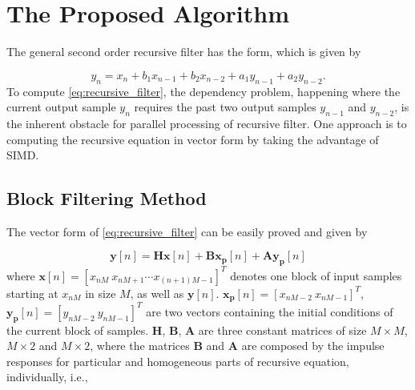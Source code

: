 \section{The Proposed Algorithm}
\label{sec:algorithm}

The general second order recursive filter has the form, which is given by

\begin{equation}
    \label{eq:recursive_filter}
    y_n = x_n + b_1x_{n-1} + b_2x_{n-2} + a_1y_{n-1} + a_2y_{n-2}.
\end{equation}
To compute \eqref{eq:recursive_filter}, the dependency problem, happening where the current output sample $y_n$
requires the past two output samples $y_{n-1}$ and $y_{n-2}$, is the inherent obstacle for parallel processing of recursive filter.
One approach is to computing the recursive equation in vector form by taking the advantage of SIMD. 


\subsection{Block Filtering Method}

The vector form of \eqref{eq:recursive_filter} can be easily proved and given by

\begin{equation}
    \label{eq:block_filtering}
    \bm{y}[n] = \bm{H}\bm{x}[n] + \bm{B}\bm{x_p}[n] + \bm{A}\bm{y_p}[n] 
\end{equation}
where $\bm{x}[n] = \left[x_{nM}~x_{nM+1} \cdots x_{(n+1)M-1}\right]^T$ denotes one block of input samples starting at $x_{nM}$ in size $M$,
as well as $\bm{y}[n]$. $\bm{x_p}[n]=\left[x_{nM-2}~x_{nM-1}\right]^T$, $\bm{y_p}[n]=\left[y_{nM-2}~y_{nM-1}\right]^T$ are two vectors 
containing the initial conditions of the current block of samples. 
$\bm{H}$, $\bm{B}$, $\bm{A}$ are three constant matrices of size $M \times M$,
$M \times 2$ and $M \times 2$, where
the matrices $\bm{B}$ and $\bm{A}$ are composed by the impulse responses for particular and homogeneous parts of recursive equation, individually, i.e.,

